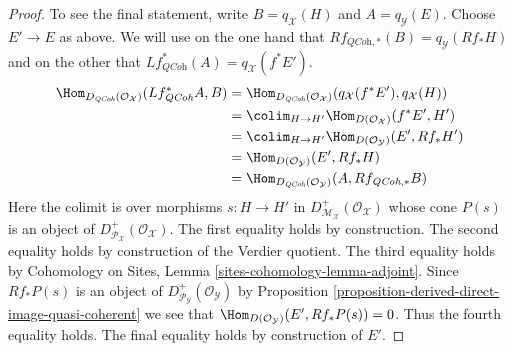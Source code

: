 \begin{proof}
\medskip\noindent
To see the final statement, write $B = q_\mathcal{X}(H)$ and
$A = q_\mathcal{Y}(E)$.
Choose $E' \to E$ as above.
We will use on the one hand that
$Rf_{\textit{QCoh}, *}(B) = q_\mathcal{Y}(Rf_*H)$
and on the other that
$Lf^*_{\textit{QCoh}}(A) = q_\mathcal{X}(f^*E')$.
\begin{align*}
\Hom_{D_{\textit{QCoh}}(\mathcal{O}_\mathcal{X})}(Lf^*_{\textit{QCoh}}A, B)
& = 
\Hom_{D_{\textit{QCoh}}(\mathcal{O}_\mathcal{X})}(q_\mathcal{X}(f^*E'),
q_\mathcal{X}(H)) \\
& = 
\colim_{H \to H'} \Hom_{D(\mathcal{O}_\mathcal{X})}(f^*E', H') \\
& = \colim_{H \to H'} \Hom_{D(\mathcal{O}_\mathcal{Y})}(E', Rf_*H') \\
& = \Hom_{D(\mathcal{O}_\mathcal{Y})}(E', Rf_*H) \\
& =
\Hom_{D_{\textit{QCoh}}(\mathcal{O}_\mathcal{Y})}(A, Rf_{\textit{QCoh}, *}B)
\end{align*}
Here the colimit is over morphisms $s : H \to H'$ in
$D^+_{\mathcal{M}_\mathcal{X}}(\mathcal{O}_\mathcal{X})$
whose cone $P(s)$ is an object of
$D^+_{\mathcal{P}_\mathcal{X}}(\mathcal{O}_\mathcal{X})$.
The first equality holds by construction.
The second equality holds by construction of the Verdier quotient.
The third equality holds by
Cohomology on Sites, Lemma \ref{sites-cohomology-lemma-adjoint}.
Since $Rf_*P(s)$ is an object of
$D^+_{\mathcal{P}_\mathcal{Y}}(\mathcal{O}_\mathcal{Y})$ by
Proposition \ref{proposition-derived-direct-image-quasi-coherent}
we see that $\Hom_{D(\mathcal{O}_\mathcal{Y})}(E', Rf_*P(s)) = 0$.
Thus the fourth equality holds. The final equality
holds by construction of $E'$.
\end{proof}














